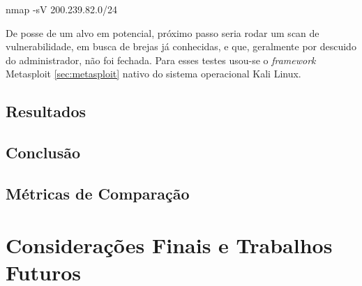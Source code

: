 \documentclass[
	12pt,				
	openright,		
	twoside,	
	a4paper,
	english,	
	brazil	
	]{abntex2}
\begin{document}
nmap -sV 200.239.82.0/24

De posse de um alvo em potencial, próximo passo seria rodar um scan de vulnerabilidade, em busca de brejas já conhecidas, e que, geralmente por descuido do administrador, não foi fechada. Para esses testes usou-se o \textit{framework} Metasploit \ref{sec:metasploit} nativo do sistema operacional Kali Linux.

\section{Resultados} \label{sec:resultados}
\section{Conclusão} \label{sec:conclusão}
\section{Métricas de Comparação}
\chapter{Considerações Finais e Trabalhos Futuros} \label{considerações}
\postextual

\printindex
\end{document}
